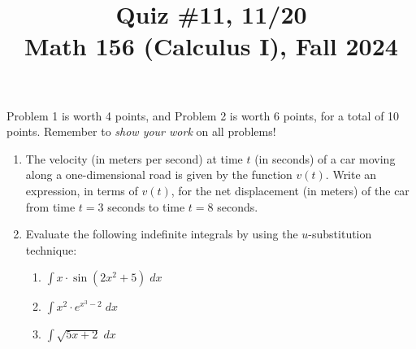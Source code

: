 \documentclass[11pt]{article}
\title{Quiz \#11, 11/20 \\ Math 156 (Calculus I), Fall 2024}
\date{}
\begin{document}
\maketitle

\thispagestyle{empty}

\vspace{-1.75cm}

Problem 1 is worth 4 points, and Problem 2 is worth 6 points, for a total of 10 points. Remember to \emph{show your work} on all problems!

\begin{enumerate}
\item The velocity (in meters per second) at time $t$ (in seconds) of a car moving along a one-dimensional road is given by the function $v(t)$. Write an expression, in terms of $v(t)$, for the net displacement (in meters) of the car from time $t=3$ seconds to time $t=8$ seconds.

\vspace{3.5cm}

\item Evaluate the following indefinite integrals by using the $u$-substitution technique:
\begin{enumerate}
\item $\int x\cdot \sin(2x^2+5) \; dx$
\item $\int x^2 \cdot e^{x^3-2} \; dx$
\item $\int \sqrt{5x+2} \; dx$
\end{enumerate}

\end{enumerate}
\end{document}
